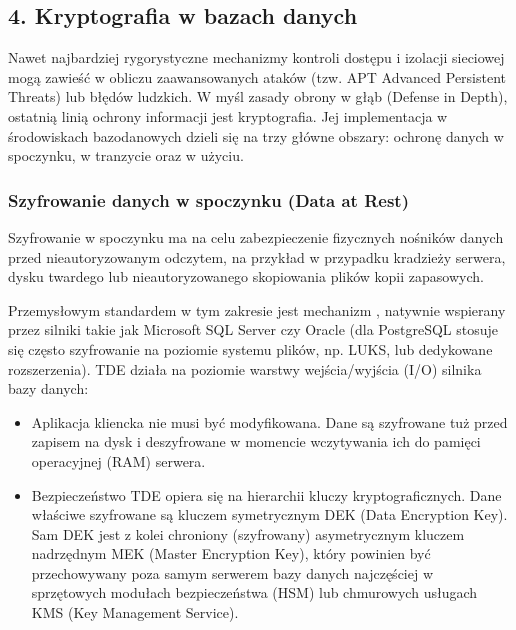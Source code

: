 \documentclass[a4paper,11pt,english,openany,oneside]{sphinxmanual}
\begin{document}
\sphinxstepscope


\subsection{4. Kryptografia w bazach danych}
\label{\detokenize{rozdzial_2/rozdzial_27/rozdzial_4:kryptografia-w-bazach-danych}}\label{\detokenize{rozdzial_2/rozdzial_27/rozdzial_4::doc}}
\sphinxAtStartPar
Nawet najbardziej rygorystyczne mechanizmy kontroli dostępu i izolacji sieciowej mogą zawieść w obliczu zaawansowanych ataków (tzw. APT \textendash{} Advanced Persistent Threats) lub błędów ludzkich. W myśl zasady obrony w głąb (Defense in Depth), ostatnią linią ochrony informacji jest kryptografia. Jej implementacja w środowiskach bazodanowych dzieli się na trzy główne obszary: ochronę danych w spoczynku, w tranzycie oraz w użyciu.


\subsubsection{Szyfrowanie danych w spoczynku (Data at Rest)}
\label{\detokenize{rozdzial_2/rozdzial_27/rozdzial_4:szyfrowanie-danych-w-spoczynku-data-at-rest}}
\sphinxAtStartPar
Szyfrowanie w spoczynku ma na celu zabezpieczenie fizycznych nośników danych przed nieautoryzowanym odczytem, na przykład w przypadku kradzieży serwera, dysku twardego lub nieautoryzowanego skopiowania plików kopii zapasowych.

\sphinxAtStartPar
Przemysłowym standardem w tym zakresie jest mechanizm , natywnie wspierany przez silniki takie jak Microsoft SQL Server czy Oracle (dla PostgreSQL stosuje się często szyfrowanie na poziomie systemu plików, np. LUKS, lub dedykowane rozszerzenia). TDE działa na poziomie warstwy wejścia/wyjścia (I/O) silnika bazy danych:
\begin{itemize}
\item {} 
\sphinxAtStartPar
{} Aplikacja kliencka nie musi być modyfikowana. Dane są szyfrowane tuż przed zapisem na dysk i deszyfrowane w momencie wczytywania ich do pamięci operacyjnej (RAM) serwera.

\item {} 
\sphinxAtStartPar
{} Bezpieczeństwo TDE opiera się na hierarchii kluczy kryptograficznych. Dane właściwe szyfrowane są kluczem symetrycznym DEK (Data Encryption Key). Sam DEK jest z kolei chroniony (szyfrowany) asymetrycznym kluczem nadrzędnym MEK (Master Encryption Key), który powinien być przechowywany poza samym serwerem bazy danych \textendash{} najczęściej w sprzętowych modułach bezpieczeństwa (HSM) lub chmurowych usługach KMS (Key Management Service).

\end{itemize}
\end{document}
